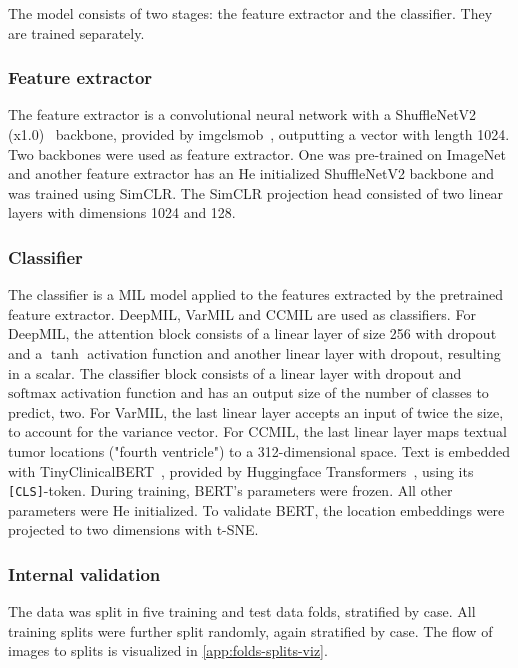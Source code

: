The model consists of two stages: the feature extractor and the classifier.
They are trained separately.

\subsubsection{Feature extractor}
The feature extractor is a convolutional neural network with a ShuffleNetV2 (x1.0)~ backbone, provided by imgclsmob~, outputting a vector with length 1024.
Two backbones were used as feature extractor.
One was pre-trained on ImageNet and another feature extractor has an He initialized ShuffleNetV2 backbone and was trained using SimCLR.
The SimCLR projection head consisted of two linear layers with dimensions 1024 and 128.

\subsubsection{Classifier}
The classifier is a MIL model applied to the features extracted by the pretrained feature extractor.
DeepMIL, VarMIL and CCMIL are used as classifiers.
For DeepMIL, the attention block consists of a linear layer of size 256 with dropout and a $\tanh$ activation function and another linear layer with dropout, resulting in a scalar.
The classifier block consists of a linear layer with dropout and $\mathrm{softmax}$ activation function and has an output size of the number of classes to predict, \ie two.
For VarMIL, the last linear layer accepts an input of twice the size, to account for the variance vector.
For CCMIL, the last linear layer maps textual tumor locations (\eg "fourth ventricle") to a 312-dimensional space.
Text is embedded with TinyClinicalBERT~, provided by Huggingface Transformers~, using its \texttt{[CLS]}-token.
During training, BERT's parameters were frozen.
All other parameters were He initialized.
To validate BERT, the location embeddings were projected to two dimensions with t-SNE.

\subsubsection{Internal validation}\label{subsubsec:slicom-folds}
The data was split in five training and test data folds, stratified by case.
All training splits were further split randomly, again stratified by case.
The flow of images to splits is visualized in \cref{app:folds-splits-viz}.

